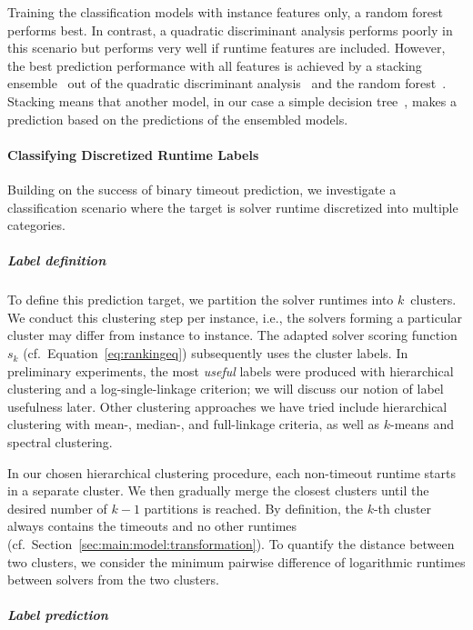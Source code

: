 \documentclass[sn-basic, Numbered]{sn-jnl} %
\begin{document}
Training the classification models with instance features only, a random forest performs best.
In contrast, a quadratic discriminant analysis performs poorly in this scenario but performs very well if runtime features are included.
However, the best prediction performance with all features is achieved by a stacking ensemble~\cite{wolpert1992stacked} out of the quadratic discriminant analysis~\cite{tharwat2016linear} and the random forest~\cite{breiman2001random}.
Stacking means that another model, in our case a simple decision tree~\cite{breiman1984classification}, makes a prediction based on the predictions of the ensembled models.

\paragraph{Classifying Discretized Runtime Labels}

Building on the success of binary timeout prediction, we investigate a classification scenario where the target is solver runtime discretized into multiple categories.

\subparagraph{Label definition}

To define this prediction target, we partition the solver runtimes into $k$~clusters.
We conduct this clustering step per instance, i.e., the solvers forming a particular cluster may differ from instance to instance.
The adapted solver scoring function~$s_k$ (cf.~Equation~\eqref{eq:rankingeq}) subsequently uses the cluster labels.
In preliminary experiments, the most \emph{useful} labels were produced with hierarchical clustering and a log-single-linkage criterion; we will discuss our notion of label usefulness later.
Other clustering approaches we have tried include hierarchical clustering with mean-, median-, and full-linkage criteria, as well as $k$-means and spectral clustering.

In our chosen hierarchical clustering procedure, each non-timeout runtime starts in a separate cluster.
We then gradually merge the closest clusters until the desired number of $k-1$ partitions is reached.
By definition, the $k$-th cluster always contains the timeouts and no other runtimes (cf.~Section~\ref{sec:main:model:transformation}).
To quantify the distance between two clusters, we consider the minimum pairwise difference of logarithmic runtimes between solvers from the two clusters.

\subparagraph{Label prediction}
\end{document}
